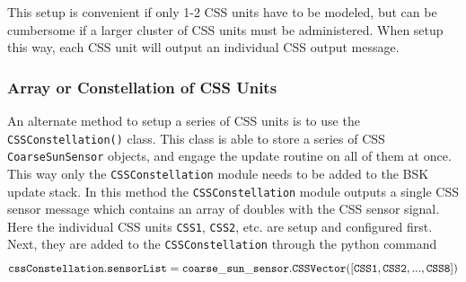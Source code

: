 This setup is convenient if only 1-2 CSS units have to be modeled, but can be cumbersome if a larger cluster of CSS units must be administered.  When setup this way, each CSS unit will output an individual CSS output message.

\subsubsection{Array or Constellation of CSS Units}
An alternate method to setup a series of CSS units is to use the {\tt CSSConstellation()} class.  This class is able to store a series of CSS {\tt CoarseSunSensor} objects, and engage the update routine on all of them at once.  This way only the {\tt CSSConstellation} module needs to be added to the BSK update stack.  In this method the
{\tt CSSConstellation} module outputs a single CSS sensor message which contains an array of doubles with the CSS sensor signal.  Here the individual CSS units {\tt CSS1}, {\tt CSS2}, etc. are setup and configured first.  Next, they are added to the {\tt CSSConstellation} through the python command
$$
	{\tt cssConstellation.sensorList = coarse\_sun\_sensor.CSSVector([CSS1, CSS2, ..., CSS8])}
$$

